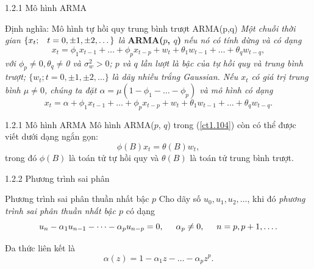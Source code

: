 \documentclass[notheorems,envcountsect,hyperref=unicode]{beamer}
\begin{document}
\begin{frame} {1.2.1 Mô hình ARMA}
	\begin{block}{Định nghĩa: Mô hình tự hồi quy trung bình trượt ARMA(p,q)}
\textit{Một chuỗi thời gian $\{x_{t}; \hspace{0.3cm} t=0,\pm1,\pm2, \dots\}$ là} \textbf{ARMA($p$, $q$)} \textit{nếu nó có tính dừng và có dạng
	\begin{equation}
	x_{t}= \phi_{1}x_{t-1}+ \dots+\phi_{p}x_{t-p} + w_{t} + \theta_{1}w_{t-1}+ \dots+ \theta_{q}w_{t-q}, \label{ct1.104}
	\end{equation}
	với $\phi_{p} \neq 0, \theta_q \neq $0 và $\sigma_{w}^{2}> 0$; $p$ và $q$ lần lượt là bậc của tự hồi quy và trung bình trượt; $\{w_{t}; t = 0, \pm 1, \pm 2, \dots\}$ là dãy nhiễu trắng Gaussian. Nếu $x_{t}$ có giá trị trung bình $\mu \neq 0$, chúng ta đặt $\alpha = \mu(1 − \phi_{1} -\dots- \phi_{p})$ và mô hình có dạng
	\begin{equation}
	x_{t}= \alpha + \phi_{1}x_{t-1}+\dots+\phi_{p}x_{t-p}+w_{t}+\theta_{1}w_{t-1}+\dots+\theta_{q}w_{t-q}. \label{ct1.105}	
	\end{equation}}
	\end{block}
\end{frame}

\begin{frame}{1.2.1 Mô hình ARMA}
 Mô hình ARMA($p$, $q$) trong (\ref{ct1.104}) còn có thể được viết dưới dạng ngắn gọn:
\begin{equation}
\phi(B)x_{t}= \theta(B)w_{t}, \label{ct1.106}
\end{equation}
trong đó $\phi(B) $ là toán tử tự hồi quy và $\theta(B)$ là toán tử trung bình trượt.
\end{frame}

\begin{frame}{1.2.2 Phương trình sai phân}
\begin{block}{Phương trình sai phân thuần nhất bậc $p$}
Cho dãy số $u_0, u_1, u_2, \dots$, khi đó \textit{phương trình sai phân thuần nhất bậc $p$} có dạng
\begin{equation}
u_n-\alpha_1 u_{n-1}-\dots-\alpha_p u_{n-p}=0, \hspace{0.5cm}\alpha_p\neq 0, \hspace{0.5cm} n=p, p+1,\dots. \label{ct3.34}
\end{equation}
\end{block}
Đa thức liên kết là 
$$\alpha(z)=1-\alpha_1z-\dots-\alpha_pz^p.$$
\end{frame}
\end{document}
